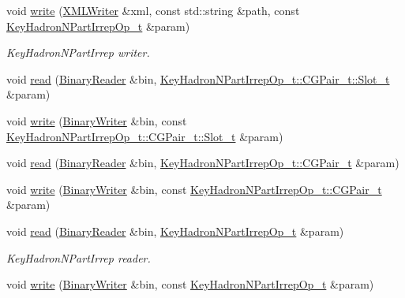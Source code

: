 \begin{DoxyCompactItemize}
void \mbox{\hyperlink{namespaceHadron_a6789ce2b1b787b1f3136c9a2836448a1}{write}} (\mbox{\hyperlink{classADATXML_1_1XMLWriter}{X\+M\+L\+Writer}} \&xml, const std\+::string \&path, const \mbox{\hyperlink{structHadron_1_1KeyHadronNPartIrrepOp__t}{Key\+Hadron\+N\+Part\+Irrep\+Op\+\_\+t}} \&param)
\begin{DoxyCompactList}\small\item\em Key\+Hadron\+N\+Part\+Irrep writer. \end{DoxyCompactList}\item 
void \mbox{\hyperlink{namespaceHadron_ae19da1a7e40c864440841a389b468c8d}{read}} (\mbox{\hyperlink{classADATIO_1_1BinaryReader}{Binary\+Reader}} \&bin, \mbox{\hyperlink{structHadron_1_1KeyHadronNPartIrrepOp__t_1_1CGPair__t_1_1Slot__t}{Key\+Hadron\+N\+Part\+Irrep\+Op\+\_\+t\+::\+C\+G\+Pair\+\_\+t\+::\+Slot\+\_\+t}} \&param)
\item 
void \mbox{\hyperlink{namespaceHadron_a4beaf6ce4a67fc85ae046f257141250e}{write}} (\mbox{\hyperlink{classADATIO_1_1BinaryWriter}{Binary\+Writer}} \&bin, const \mbox{\hyperlink{structHadron_1_1KeyHadronNPartIrrepOp__t_1_1CGPair__t_1_1Slot__t}{Key\+Hadron\+N\+Part\+Irrep\+Op\+\_\+t\+::\+C\+G\+Pair\+\_\+t\+::\+Slot\+\_\+t}} \&param)
\item 
void \mbox{\hyperlink{namespaceHadron_a0567f3fb8f2db68b0a93251138c13a62}{read}} (\mbox{\hyperlink{classADATIO_1_1BinaryReader}{Binary\+Reader}} \&bin, \mbox{\hyperlink{structHadron_1_1KeyHadronNPartIrrepOp__t_1_1CGPair__t}{Key\+Hadron\+N\+Part\+Irrep\+Op\+\_\+t\+::\+C\+G\+Pair\+\_\+t}} \&param)
\item 
void \mbox{\hyperlink{namespaceHadron_aa05ac649ec39cb98483ab55274129758}{write}} (\mbox{\hyperlink{classADATIO_1_1BinaryWriter}{Binary\+Writer}} \&bin, const \mbox{\hyperlink{structHadron_1_1KeyHadronNPartIrrepOp__t_1_1CGPair__t}{Key\+Hadron\+N\+Part\+Irrep\+Op\+\_\+t\+::\+C\+G\+Pair\+\_\+t}} \&param)
\item 
void \mbox{\hyperlink{namespaceHadron_a205a666e574892fd5fc22e723a24399e}{read}} (\mbox{\hyperlink{classADATIO_1_1BinaryReader}{Binary\+Reader}} \&bin, \mbox{\hyperlink{structHadron_1_1KeyHadronNPartIrrepOp__t}{Key\+Hadron\+N\+Part\+Irrep\+Op\+\_\+t}} \&param)
\begin{DoxyCompactList}\small\item\em Key\+Hadron\+N\+Part\+Irrep reader. \end{DoxyCompactList}\item 
void \mbox{\hyperlink{namespaceHadron_aa056cb1973613af20ddde740db299944}{write}} (\mbox{\hyperlink{classADATIO_1_1BinaryWriter}{Binary\+Writer}} \&bin, const \mbox{\hyperlink{structHadron_1_1KeyHadronNPartIrrepOp__t}{Key\+Hadron\+N\+Part\+Irrep\+Op\+\_\+t}} \&param)

\end{DoxyCompactItemize}
